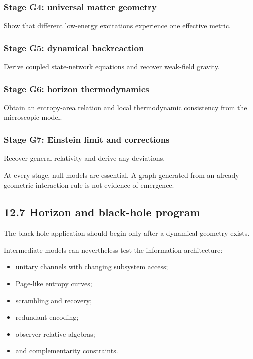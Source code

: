 \documentclass[
  11pt,
]{article}
\providecommand{\tightlist}{%
  \setlength{\itemsep}{0pt}\setlength{\parskip}{0pt}}
\begin{document}
\subsubsection{Stage G4: universal matter
geometry}\label{stage-g4-universal-matter-geometry}

Show that different low-energy excitations experience one effective
metric.

\subsubsection{Stage G5: dynamical
backreaction}\label{stage-g5-dynamical-backreaction}

Derive coupled state-network equations and recover weak-field gravity.

\subsubsection{Stage G6: horizon
thermodynamics}\label{stage-g6-horizon-thermodynamics}

Obtain an entropy-area relation and local thermodynamic consistency from
the microscopic model.

\subsubsection{Stage G7: Einstein limit and
corrections}\label{stage-g7-einstein-limit-and-corrections}

Recover general relativity and derive any deviations.

At every stage, null models are essential. A graph generated from an
already geometric interaction rule is not evidence of emergence.

\subsection{12.7 Horizon and black-hole
program}\label{horizon-and-black-hole-program}

The black-hole application should begin only after a dynamical geometry
exists.

Intermediate models can nevertheless test the information architecture:

\begin{itemize}
\tightlist
\item
  unitary channels with changing subsystem access;
\item
  Page-like entropy curves;
\item
  scrambling and recovery;
\item
  redundant encoding;
\item
  observer-relative algebras;
\item
  and complementarity constraints.
\end{itemize}
\end{document}
